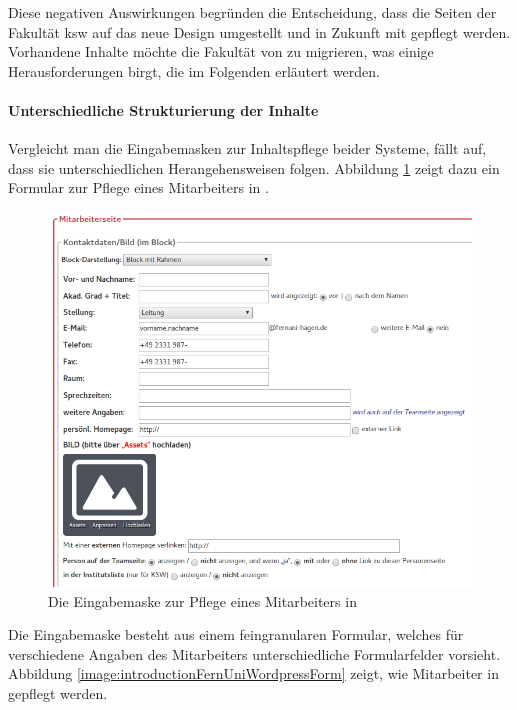         Diese negativen Auswirkungen 
        begründen die Entscheidung, dass die Seiten der Fakultät \gls{ksw}
        auf das neue Design umgestellt und in Zukunft mit {\imperia} gepflegt werden.
        Vorhandene Inhalte möchte die Fakultät von {\wordpress} zu {\imperia} migrieren,
        was einige Herausforderungen birgt, die im Folgenden erläutert werden.

        \paragraph{Unterschiedliche Strukturierung der Inhalte}
        Vergleicht man die Eingabemasken zur Inhaltspflege beider Systeme, fällt auf,
        dass sie unterschiedlichen Herangehensweisen folgen.
        Abbildung \ref{image:introductionFernUniImperiaForm} zeigt dazu ein Formular
        zur Pflege eines Mitarbeiters in {\imperia}.

        \begin{figure}[htb]
            \centering
            \includegraphics[scale=0.6]{../resources/imperia/team.png}
            \caption{Die Eingabemaske zur Pflege eines Mitarbeiters in {\imperia}}
            \label{image:introductionFernUniImperiaForm}
        \end{figure}

        Die Eingabemaske besteht aus einem feingranularen Formular,
        welches für verschiedene Angaben des Mitarbeiters unterschiedliche Formularfelder
        vorsieht.
        Abbildung \ref{image:introductionFernUniWordpressForm} zeigt,
        wie Mitarbeiter in {\wordpress} gepflegt werden.


